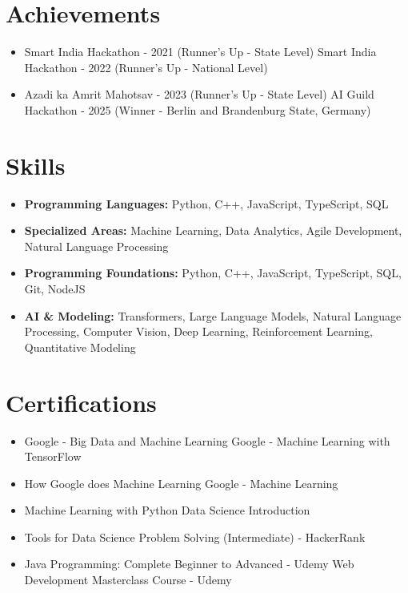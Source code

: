 \documentclass[a4paper,10pt]{article}
\begin{document}
\section*{Achievements}
\begin{itemize}
\item Smart India Hackathon - 2021 (Runner's Up - State Level) \hfill Smart India Hackathon - 2022 (Runner's Up - National Level)
\item Azadi ka Amrit Mahotsav - 2023 (Runner's Up - State Level) \hfill AI Guild Hackathon - 2025 (Winner - Berlin and Brandenburg State, Germany)
\end{itemize}

\section*{Skills}
\begin{itemize}
  \item \textbf{Programming Languages:} Python, C++, JavaScript, TypeScript, SQL
  \item \textbf{Specialized Areas:} Machine Learning, Data Analytics, Agile Development, Natural Language Processing
  \item \textbf{Programming Foundations:} Python, C++, JavaScript, TypeScript, SQL, Git, NodeJS
  \item \textbf{AI \& Modeling:} Transformers, Large Language Models, Natural Language Processing, Computer Vision, Deep Learning, Reinforcement Learning, Quantitative Modeling
\end{itemize}

\section*{Certifications}
\begin{itemize}
\item Google - Big Data and Machine Learning \hfill Google - Machine Learning with TensorFlow
\item How Google does Machine Learning \hfill Google - Machine Learning
\item Machine Learning with Python \hfill Data Science Introduction
\item Tools for Data Science \hfill Problem Solving (Intermediate) - HackerRank
\item Java Programming: Complete Beginner to Advanced - Udemy \hfill Web Development Masterclass Course - Udemy
\end{itemize}
\end{document}
